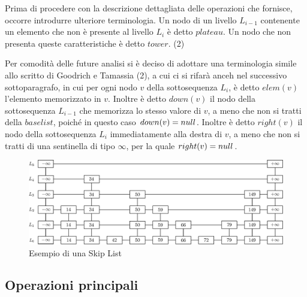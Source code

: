 	Prima di procedere con la descrizione dettagliata delle operazioni che fornisce, occorre introdurre ulteriore terminologia. Un nodo di un livello $ L_{i-1} $ contenente un elemento che non è presente al livello $ L_{i} $ è detto $ plateau $. Un nodo che non presenta queste caratteristiche è detto $ tower $. (2)
	
	Per comodità delle future analisi si è deciso di adottare una terminologia simile allo scritto di Goodrich e Tamassia (2), a cui ci si rifarà anceh nel successivo sottoparagrafo, in cui per ogni nodo $ v $ della sottosequenza $ L_{i} $, è detto $ elem(v) $ l'elemento memorizzato in $ v $. Inoltre è detto $ down(v) $ il nodo della sottosequenza $ L_{i-1} $ che memorizza lo stesso valore di $ v $, a meno che non si tratti della $base list$, poiché in questo caso $down(v) = \boldmath{null}$.
	Inoltre è detto $right(v)$ il nodo della sottosequenza $ L_{i} $ immediatamente alla destra di $v$, a meno che non si tratti di una sentinella di tipo $\infty$, per la quale $right(v) = \boldmath{null}$.
		
	\begin{figure}
		\centering
		\includegraphics[scale=0.6]{figure/skiplist.eps}
		\caption{Esempio di una Skip List}\label{fig:1}
	\end{figure}
		
	\subsection{Operazioni principali}
	
%		

